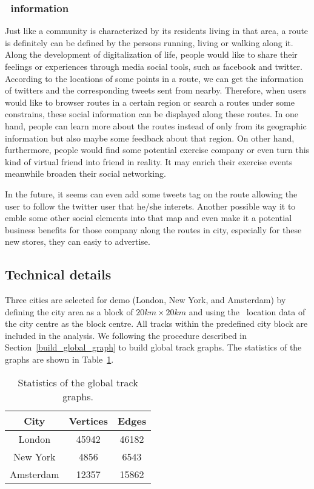 \subsubsection{\twitter\ information}

Just like a community is characterized by its residents living in that area, a route is definitely can be defined by the persons running, living or walking along it.
Along the development of digitalization of life, people would like to share their feelings or experiences through media social tools, such as facebook and twitter.
According to the locations of some points in a route, we can get the information of twitters and the corresponding tweets sent from nearby.
Therefore, when users would like to browser routes in a certain region or search a routes under some constrains, these social information can be displayed along these routes.
In one hand, people can learn more about the routes instead of only from its geographic information but also maybe some feedback about that region.
On other hand, furthermore, people would find some potential exercise company or even turn this kind of virtual friend into friend in reality.
It may enrich their exercise events meanwhile broaden their social networking.

In the future, it seems can even add some tweets tag on the route allowing the user to follow the twitter user that he/she interets. Another possible way it to emble some other social elements into that map and even make it a potential business benefits for those company along the routes in city, especially for these new stores, they can easiy to advertise.


\subsection{Technical details}

Three cities are selected for demo (London, New York, and Amsterdam) by defining the city area as a block of $20km\times20km$ and using the \gps\ location data of the city centre as the block centre.
All tracks within the predefined city block are included in the analysis.
We following the procedure described in Section~\ref{build_global_graph} to build global track graphs.
The statistics of the graphs are shown in Table~\ref{graph_statistics}.

\begin{table}
	\begin{center}
		\begin{tabular}{|c||c|c|}\hline
			City & Vertices & Edges  \\ \hline \hline
			London & 45942 & 46182\\ \hline
			New York & 4856 & 6543\\ \hline
			Amsterdam & 12357 & 15862 \\ \hline
		\end{tabular}
		\caption{Statistics of the global track graphs.}
		\label{graph_statistics}
	\end{center}
\end{table}










